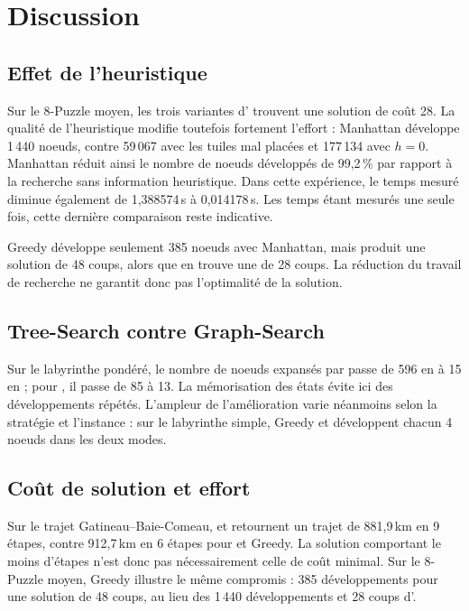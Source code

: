 \section{Discussion}

\subsection{Effet de l'heuristique}

Sur le 8-Puzzle moyen, les trois variantes d'\AStar{} trouvent une solution de
coût 28. La qualité de l'heuristique modifie toutefois fortement l'effort :
Manhattan développe 1\,440 noeuds, contre 59\,067 avec les tuiles mal placées
et 177\,134 avec $h=0$. Manhattan réduit ainsi le nombre de noeuds développés
de 99,2\,\% par rapport à la recherche sans information heuristique. Dans
cette expérience, le temps mesuré diminue également de 1,388574\,s à
0,014178\,s. Les temps étant mesurés une seule fois, cette dernière
comparaison reste indicative.

Greedy développe seulement 385 noeuds avec Manhattan, mais produit une
solution de 48 coups, alors que \AStar{} en trouve une de 28 coups. La
réduction du travail de recherche ne garantit donc pas l'optimalité de la
solution.

\subsection{Tree-Search contre Graph-Search}

Sur le labyrinthe pondéré, le nombre de noeuds expansés par \UCS{} passe de
596 en \TreeSearch{} à 15 en \GraphSearch{}; pour \BFS{}, il passe de 85 à
13. La mémorisation des états évite ici des développements répétés. L'ampleur
de l'amélioration varie néanmoins selon la stratégie et l'instance : sur le
labyrinthe simple, Greedy et \AStar{} développent chacun 4 noeuds dans les
deux modes.

\subsection{Coût de solution et effort}

Sur le trajet Gatineau--Baie-Comeau, \UCS{} et \AStar{} retournent un trajet
de 881,9\,km en 9 étapes, contre 912,7\,km en 6 étapes pour \BFS{} et Greedy.
La solution comportant le moins d'étapes n'est donc pas nécessairement celle
de coût minimal. Sur le 8-Puzzle moyen, Greedy illustre le même compromis :
385 développements pour une solution de 48 coups, au lieu des 1\,440
développements et 28 coups d'\AStar{}.

